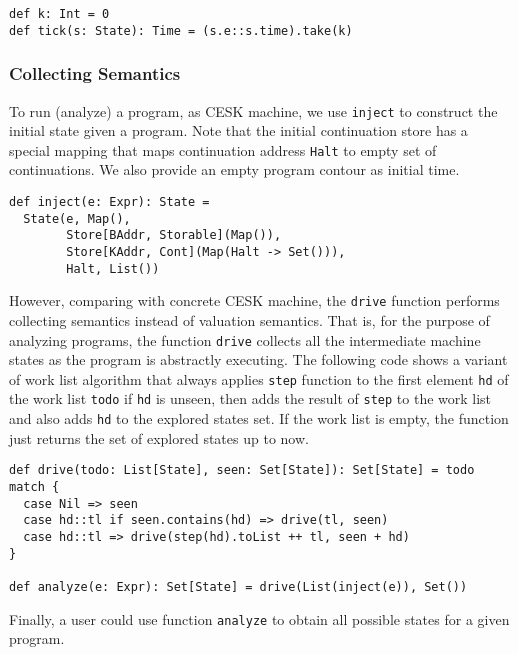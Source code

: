 \documentclass[acmsmall,review,anonymous]{acmart}\settopmatter{printfolios=true,printccs=false,printacmref=false}
\begin{document}
\begin{verbatim}
def k: Int = 0
def tick(s: State): Time = (s.e::s.time).take(k)
\end{verbatim}

\subsubsection{Collecting Semantics}

To run (analyze) a program, as CESK machine, we use \texttt{inject} to construct
the initial state given a program. 
Note that the initial continuation store has a special mapping that maps continuation address
\texttt{Halt} to empty set of continuations.
We also provide an empty program contour as initial time.
\begin{verbatim}
def inject(e: Expr): State = 
  State(e, Map(), 
        Store[BAddr, Storable](Map()), 
        Store[KAddr, Cont](Map(Halt -> Set())), 
        Halt, List())
\end{verbatim}

However, comparing with concrete CESK machine, the
\texttt{drive} function performs collecting semantics instead of valuation
semantics. That is, for the purpose of analyzing programs, the function \texttt{drive}
collects all the intermediate machine states as the program is abstractly executing.
The following code shows a variant of work list algorithm that always applies \texttt{step}
function to the first element \texttt{hd} of the work list \texttt{todo} if \texttt{hd}
is unseen, then adds the result of \texttt{step} to the work list and also adds \texttt{hd}
to the explored states set.
If the work list is empty, the function just
returns the set of explored states up to now.

\begin{verbatim}
def drive(todo: List[State], seen: Set[State]): Set[State] = todo match {
  case Nil => seen
  case hd::tl if seen.contains(hd) => drive(tl, seen)
  case hd::tl => drive(step(hd).toList ++ tl, seen + hd)
}

def analyze(e: Expr): Set[State] = drive(List(inject(e)), Set())
\end{verbatim}

Finally, a user could use function \texttt{analyze} to obtain all possible states 
for a given program.

\end{document}
